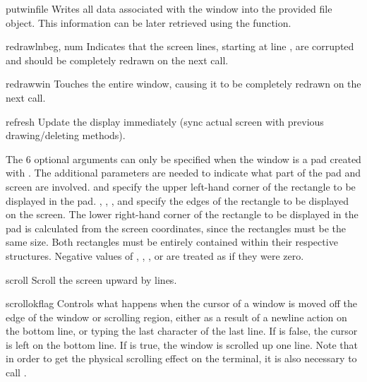 \begin{methoddesc}{putwin}{file}
Writes all data associated with the window into the provided file
object.  This information can be later retrieved using the
 function.

\end{methoddesc}

\begin{methoddesc}{redrawln}{beg, num}
Indicates that the  screen lines, starting at line ,
are corrupted and should be completely redrawn on the next
 call.
\end{methoddesc}

\begin{methoddesc}{redrawwin}{}
Touches the entire window, causing it to be completely redrawn on the
next  call.
\end{methoddesc}

\begin{methoddesc}{refresh}{}
Update the display immediately (sync actual screen with previous
drawing/deleting methods).

The 6 optional arguments can only be specified when the window is a
pad created with .  The additional parameters are
needed to indicate what part of the pad and screen are involved.
 and  specify the upper left-hand corner of the
rectangle to be displayed in the pad.  , ,
, and  specify the edges of the rectangle to
be displayed on the screen.  The lower right-hand corner of the
rectangle to be displayed in the pad is calculated from the screen
coordinates, since the rectangles must be the same size.  Both
rectangles must be entirely contained within their respective
structures.  Negative values of , ,
, or  are treated as if they were zero.
\end{methoddesc}

\begin{methoddesc}{scroll}{}
Scroll the screen upward by  lines.
\end{methoddesc}

\begin{methoddesc}{scrollok}{flag}
Controls what happens when the cursor of a window is moved off the
edge of the window or scrolling region, either as a result of a
newline action on the bottom line, or typing the last character
of the last line.  If  is false, the cursor is left
on the bottom line.  If  is true, the window is
scrolled up one line.  Note that in order to get the physical
scrolling effect on the terminal, it is also necessary to call
.
\end{methoddesc}

